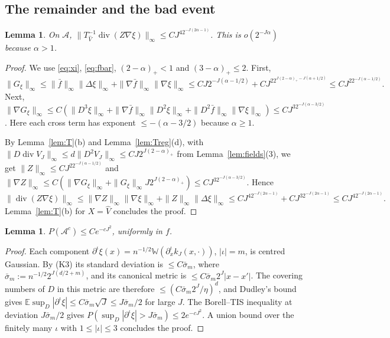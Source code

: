 \documentclass[11pt]{article}
\newtheorem{lemma}[theorem]{Lemma}
\theoremstyle{definition}
\theoremstyle{remark}
\newcommand{\E}{\mathbb E}
\newcommand{\W}{\mathbb W}
\newcommand{\dv}{\operatorname{div}}
\newcommand{\cA}{\mathcal A}
\begin{document}
\subsection{The remainder and the bad event}

\begin{lemma}\label{lem:rem}
On $\cA$, $\|T^{-1}_{\hat V}\dv(Z\nabla\xi)\|_\infty\le CJ^42^{-J(2\alpha-1)}$. This is $o(2^{-J\alpha})$ because $\alpha>1$.
\end{lemma}

\begin{proof}
We use \eqref{eq:xi}, \eqref{eq:fbar}, $(2-\alpha)_+<1$ and $(3-\alpha)_+\le2$. First,
\[
\|G_\xi\|_\infty\le\|\bar f\|_\infty\|\Delta\xi\|_\infty+\|\nabla\bar f\|_\infty\|\nabla\xi\|_\infty\le CJ2^{-J(\alpha-1/2)}+CJ^22^{J(2-\alpha)_+-J(\alpha+1/2)}\le CJ^22^{-J(\alpha-1/2)} .
\]
Next, $\|\nabla G_\xi\|_\infty\le C(\|D^3\xi\|_\infty+\|\nabla\bar f\|_\infty\|D^2\xi\|_\infty+\|D^2\bar f\|_\infty\|\nabla\xi\|_\infty)\le CJ^32^{-J(\alpha-3/2)}$. Here each cross term has exponent $\le-(\alpha-3/2)$ because $\alpha\ge1$.

By Lemma~\ref{lem:T}(b) and Lemma~\ref{lem:Treg}(d), with $\|D\dv V_J\|_\infty\le d\|D^2V_J\|_\infty\le CJ2^{J(2-\alpha)_+}$ from Lemma~\ref{lem:fields}(3), we get
$\|Z\|_\infty\le CJ^22^{-J(\alpha-1/2)}$ and
$\|\nabla Z\|_\infty\le C(\|\nabla G_\xi\|_\infty+\|G_\xi\|_\infty J2^{J(2-\alpha)_+})\le CJ^32^{-J(\alpha-3/2)}$.
Hence
\[
\|\dv(Z\nabla\xi)\|_\infty\le\|\nabla Z\|_\infty\|\nabla\xi\|_\infty+\|Z\|_\infty\|\Delta\xi\|_\infty\le CJ^42^{-J(2\alpha-1)}+CJ^32^{-J(2\alpha-1)}\le CJ^42^{-J(2\alpha-1)} .
\]
Lemma~\ref{lem:T}(b) for $X=\hat V$ concludes the proof.
\end{proof}

\begin{lemma}\label{lem:bad}
$P(\cA^c)\le Ce^{-cJ^2}$, uniformly in $f$.
\end{lemma}

\begin{proof}
Each component $\partial^\iota\xi(x)=n^{-1/2}\W(\partial^\iota_xk_J(x,\cdot))$, $|\iota|=m$, is centred Gaussian. By (K3) its standard deviation is $\le C\bar\sigma_m$, where $\bar\sigma_m:=n^{-1/2}2^{J(d/2+m)}$, and its canonical metric is $\le C\bar\sigma_m2^J|x-x'|$. The covering numbers of $D$ in this metric are therefore $\le(C\bar\sigma_m2^J/\eta)^d$, and Dudley's bound gives $\E\sup_D|\partial^\iota\xi|\le C\bar\sigma_m\sqrt J\le J\bar\sigma_m/2$ for large $J$. The Borell--TIS inequality at deviation $J\bar\sigma_m/2$ gives $P(\sup_D|\partial^\iota\xi|>J\bar\sigma_m)\le2e^{-cJ^2}$. A union bound over the finitely many $\iota$ with $1\le|\iota|\le3$ concludes the proof.
\end{proof}
\end{document}

